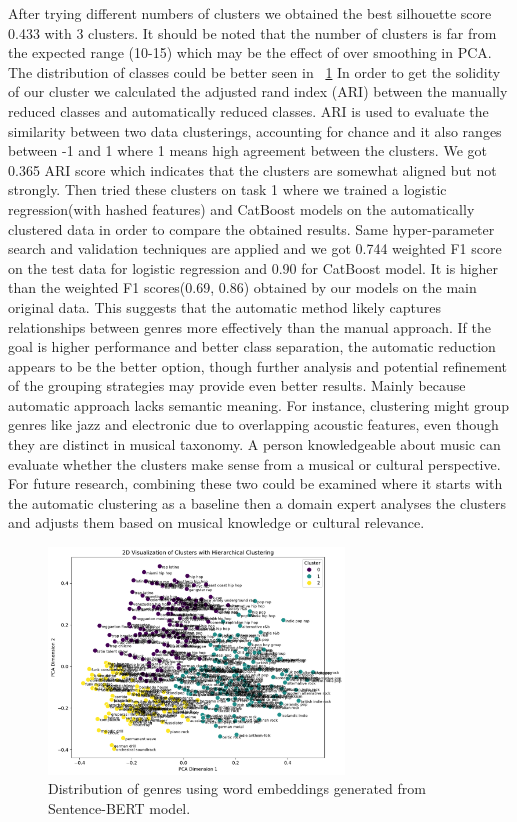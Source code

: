 \documentclass{article}
\begin{document}
After trying different numbers of clusters we obtained the best silhouette score 0.433 with 3 clusters. It should be noted that the number of clusters is far from the expected range (10-15) which may be the effect of over smoothing in PCA. The distribution of classes could be better seen in ~\ref{fig: 2D Visualization of Clusters with Hierarchical Clustering} In order to get the solidity of our cluster we calculated the adjusted rand index (ARI) between the manually reduced classes and automatically reduced classes. ARI is used to evaluate the similarity between two data clusterings, accounting for chance and it also ranges between -1 and 1 where 1 means high agreement between the clusters. We got 0.365 ARI score which indicates that the clusters are somewhat aligned but not strongly. Then tried these clusters on task 1 
 where we trained a logistic regression(with hashed features) and CatBoost models on the automatically clustered data in order to compare the obtained results. Same hyper-parameter search and validation techniques are applied and we got 0.744 weighted F1 score on the test data for logistic regression and 0.90 for CatBoost model. It is higher than the weighted F1 scores(0.69, 0.86) obtained by our models on the main original data. This suggests that the automatic method likely captures relationships between genres more effectively than the manual approach. If the goal is higher performance and better class separation, the automatic reduction appears to be the better option, though further analysis and potential refinement of the grouping strategies may provide even better results. Mainly because automatic approach lacks semantic meaning. For instance, clustering might group genres like jazz and electronic due to overlapping acoustic features, even though they are distinct in musical taxonomy. A person knowledgeable about music can evaluate whether the clusters make sense from a musical or cultural perspective. For future research, combining these two could be examined where it starts with the automatic clustering as a baseline then a domain expert analyses the clusters and adjusts them based on musical knowledge or cultural relevance.

\begin{figure}[h]
    \centering
    \includegraphics[width=0.7\textwidth]{genre_clusters_auto.pdf}
    \caption{Distribution of genres using word embeddings generated from Sentence-BERT model.}
    \label{fig: 2D Visualization of Clusters with Hierarchical Clustering}
\end{figure}
\end{document}
